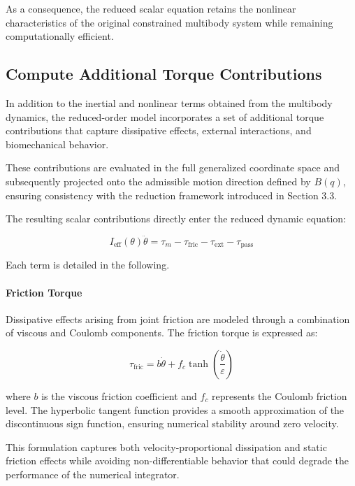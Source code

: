 As a consequence, the reduced scalar equation retains the nonlinear characteristics of the original constrained multibody system while remaining computationally efficient.


\subsection{Compute Additional Torque Contributions}
In addition to the inertial and nonlinear terms obtained from the multibody dynamics, the reduced-order model incorporates a set of additional torque contributions that capture dissipative effects, external interactions, and biomechanical behavior.

These contributions are evaluated in the full generalized coordinate space and subsequently projected onto the admissible motion direction defined by  $B(q)$, ensuring consistency with the reduction framework introduced in Section 3.3.

The resulting scalar contributions directly enter the reduced dynamic equation:

\begin{equation}
    I_{\text{eff}}(\theta)\ddot{\theta} = \tau_m - \tau_{\text{fric}} - \tau_{\text{ext}} - \tau_{\text{pass}}
\end{equation}

Each term is detailed in the following.

\paragraph{Friction Torque}
Dissipative effects arising from joint friction are modeled through a combination of viscous and Coulomb components. The friction torque is expressed as:

\begin{equation}
    \tau_{\text{fric}} = b\dot{\theta} + f_c \tanh\left(\frac{\dot{\theta}}{\varepsilon}\right)
\end{equation}

where $b$ is the viscous friction coefficient and $f_c$ represents the Coulomb friction level. The hyperbolic tangent function provides a smooth approximation of the discontinuous sign function, ensuring numerical stability around zero velocity.

This formulation captures both velocity-proportional dissipation and static friction effects while avoiding non-differentiable behavior that could degrade the performance of the numerical integrator.

